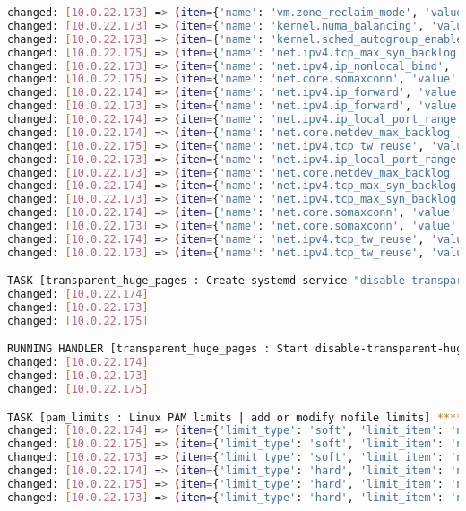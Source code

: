 \begin{flushleft}
\begin{lstlisting}[language=bash, caption=Deploy - Anhang - Deployt,captionpos=b,label={lst:deploy-appendix-deployt},breaklines=true]
changed: [10.0.22.173] => (item={'name': 'vm.zone_reclaim_mode', 'value': '0'})
changed: [10.0.22.173] => (item={'name': 'kernel.numa_balancing', 'value': '0'})
changed: [10.0.22.173] => (item={'name': 'kernel.sched_autogroup_enabled', 'value': '0'})
changed: [10.0.22.175] => (item={'name': 'net.ipv4.tcp_max_syn_backlog', 'value': '8192'})
changed: [10.0.22.173] => (item={'name': 'net.ipv4.ip_nonlocal_bind', 'value': '1'})
changed: [10.0.22.175] => (item={'name': 'net.core.somaxconn', 'value': '65535'})
changed: [10.0.22.174] => (item={'name': 'net.ipv4.ip_forward', 'value': '1'})
changed: [10.0.22.173] => (item={'name': 'net.ipv4.ip_forward', 'value': '1'})
changed: [10.0.22.174] => (item={'name': 'net.ipv4.ip_local_port_range', 'value': '10000 65535'})
changed: [10.0.22.174] => (item={'name': 'net.core.netdev_max_backlog', 'value': '10000'})
changed: [10.0.22.175] => (item={'name': 'net.ipv4.tcp_tw_reuse', 'value': '1'})
changed: [10.0.22.173] => (item={'name': 'net.ipv4.ip_local_port_range', 'value': '10000 65535'})
changed: [10.0.22.173] => (item={'name': 'net.core.netdev_max_backlog', 'value': '10000'})
changed: [10.0.22.174] => (item={'name': 'net.ipv4.tcp_max_syn_backlog', 'value': '8192'})
changed: [10.0.22.173] => (item={'name': 'net.ipv4.tcp_max_syn_backlog', 'value': '8192'})
changed: [10.0.22.174] => (item={'name': 'net.core.somaxconn', 'value': '65535'})
changed: [10.0.22.173] => (item={'name': 'net.core.somaxconn', 'value': '65535'})
changed: [10.0.22.174] => (item={'name': 'net.ipv4.tcp_tw_reuse', 'value': '1'})
changed: [10.0.22.173] => (item={'name': 'net.ipv4.tcp_tw_reuse', 'value': '1'})

TASK [transparent_huge_pages : Create systemd service "disable-transparent-huge-pages.service"] *******************************************************************************************************************
changed: [10.0.22.174]
changed: [10.0.22.173]
changed: [10.0.22.175]

RUNNING HANDLER [transparent_huge_pages : Start disable-transparent-huge-pages service] ***************************************************************************************************************************
changed: [10.0.22.174]
changed: [10.0.22.173]
changed: [10.0.22.175]

TASK [pam_limits : Linux PAM limits | add or modify nofile limits] ************************************************************************************************************************************************
changed: [10.0.22.174] => (item={'limit_type': 'soft', 'limit_item': 'nofile', 'value': 65536})
changed: [10.0.22.175] => (item={'limit_type': 'soft', 'limit_item': 'nofile', 'value': 65536})
changed: [10.0.22.173] => (item={'limit_type': 'soft', 'limit_item': 'nofile', 'value': 65536})
changed: [10.0.22.174] => (item={'limit_type': 'hard', 'limit_item': 'nofile', 'value': 200000})
changed: [10.0.22.175] => (item={'limit_type': 'hard', 'limit_item': 'nofile', 'value': 200000})
changed: [10.0.22.173] => (item={'limit_type': 'hard', 'limit_item': 'nofile', 'value': 200000})


\end{lstlisting}
\end{flushleft}
